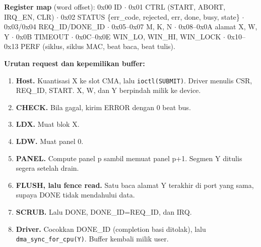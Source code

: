 \documentclass[9pt]{extarticle}
\newcommand{\code}[1]{\colorbox{bg2}{\footnotesize\texttt{#1}}}
\begin{document}
{\scriptsize
\textbf{Register map} (word offset): 0x00 ID $\cdot$ 0x01 CTRL (START, ABORT, IRQ\_EN, CLR) $\cdot$ 0x02 STATUS \{err\_code, rejected, err, done, busy, state\} $\cdot$ 0x03/0x04 REQ\_ID/DONE\_ID $\cdot$ 0x05--0x07 M, K, N $\cdot$ 0x08--0x0A alamat X, W, Y $\cdot$ 0x0B TIMEOUT $\cdot$ 0x0C--0x0E WIN\_LO, WIN\_HI, WIN\_LOCK $\cdot$ 0x10--0x13 PERF (siklus, siklus MAC, beat baca, beat tulis).

\textbf{Urutan request dan kepemilikan buffer:}
\begin{enumerate}
\item \textbf{Host.} Kuantisasi X ke slot CMA, lalu \code{ioctl(SUBMIT)}. Driver menulis CSR, REQ\_ID, START. X, W, dan Y berpindah milik ke device.
\item \textbf{CHECK.} Bila gagal, kirim ERROR dengan 0 beat bus.
\item \textbf{LDX.} Muat blok X.
\item \textbf{LDW.} Muat panel 0.
\item \textbf{PANEL.} Compute panel p sambil memuat panel p+1. Segmen Y ditulis segera setelah drain.
\item \textbf{FLUSH, lalu fence read.} Satu baca alamat Y terakhir di port yang sama, supaya DONE tidak mendahului data.
\item \textbf{SCRUB.} Lalu DONE, DONE\_ID=REQ\_ID, dan IRQ.
\item \textbf{Driver.} Cocokkan DONE\_ID (completion basi ditolak), lalu \code{dma\_sync\_for\_cpu(Y)}. Buffer kembali milik user.
\end{enumerate}}
\end{document}
